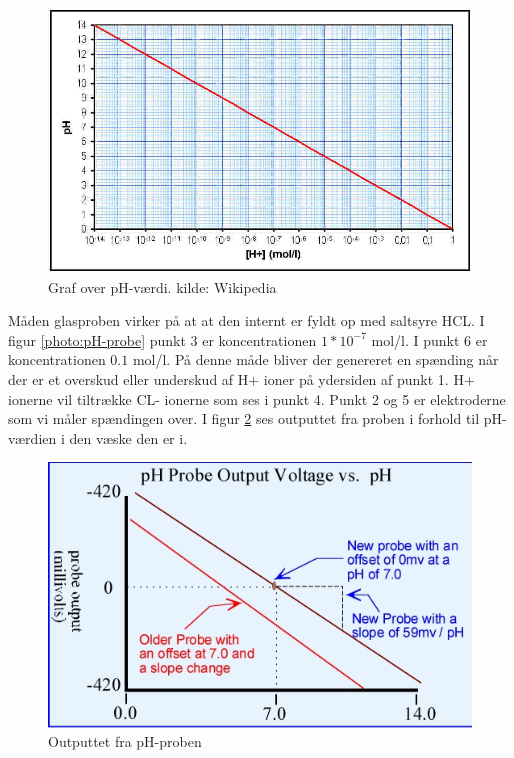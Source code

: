  \begin{figure}[H]
	\centering 
	\includegraphics[scale=0.4]{HardwareArkitektur/Sensore/pH_probe_billeder/PH-skala.jpg}
	\caption{Graf over pH-værdi. kilde: Wikipedia}
	\label{photo:pH-skala}
\end{figure}   

Måden glasproben virker på at at den internt er fyldt op med saltsyre HCL. I figur \ref{photo:pH-probe} punkt 3 er koncentrationen $1*10^{-7}$ mol/l. I punkt 6 er koncentrationen $0.1$ mol/l. På denne måde bliver der genereret en spænding når der er et overskud eller underskud af H+ ioner på ydersiden af punkt 1. H+ ionerne vil tiltrække CL- ionerne som ses i punkt 4. Punkt 2 og 5 er elektroderne som vi måler spændingen over. I figur  \ref{photo:probeslope} ses outputtet fra proben i forhold til pH-værdien i den væske den er i. 

 \begin{figure}[H]
	\centering 
	\includegraphics[scale=0.4]{HardwareArkitektur/Sensore/pH_probe_billeder/probeslope.jpg}
	\caption{Outputtet fra pH-proben}
	\label{photo:probeslope}
\end{figure} 

